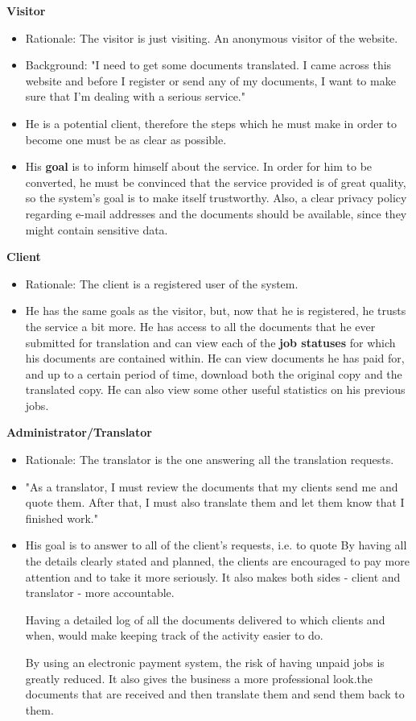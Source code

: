 \documentclass{l3proj}
\begin{document}
\textbf{Visitor}
\begin{itemize}
\item{Rationale: The visitor is just visiting. An anonymous visitor of the website.}
\item{Background: "I need to get some documents translated. I came across this website and before I register or send any of my documents, I want to make sure that I'm dealing with a serious service."}
\item{He is a potential client, therefore the steps which he must make in order to become one must be as clear as possible.}
\item{His \textbf{goal} is to inform himself about the service. In order for him to be converted, he must be convinced that the service provided is of great quality, so the system's goal is to make itself trustworthy. Also, a clear privacy policy regarding e-mail addresses and the documents should be available, since they might contain sensitive data.}
\end{itemize}
\textbf{Client}
\begin{itemize}
\item{Rationale: The client is a registered user of the system.}
\item{He has the same goals as the visitor, but, now that he is registered, he trusts the service a bit more. He has access to all the documents that he ever submitted for translation and can view each of the \textbf{job statuses} for which his documents are contained within. He can view documents he has paid for, and up to a certain period of time, download both the original copy and the translated copy. He can also view some other useful statistics on his previous jobs.}
\end{itemize}
\textbf{Administrator/Translator}
\begin{itemize}
\item{Rationale: The translator is the one answering all the translation requests.}
\item{"As a translator, I must review the documents that my clients send me and quote them. After that, I must also translate them and let them know that I finished work."}
\item{His goal is to answer to all of the client's requests, i.e. to quote By having all the details clearly stated and planned, the clients are encouraged
to pay more attention and to take it more seriously. It also makes both sides
- client and translator - more accountable.

Having a detailed log of all the documents delivered to which clients and when,
would make keeping track of the activity easier to do.

By using an electronic payment system, the risk of having unpaid jobs is greatly
reduced. It also gives the business a more professional look.the documents that are received and then translate them and send them back to them.}
\end{itemize}
\end{document}
